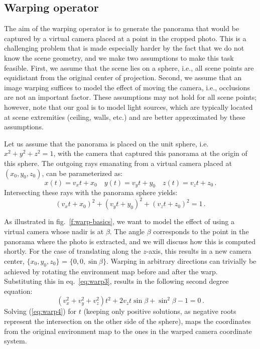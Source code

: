 \subsection{Warping operator}

The aim of the warping operator is to generate the panorama that would be captured by a virtual camera placed at a point in the cropped photo. This is a challenging problem that is made especially harder by the fact that we do not know the scene geometry, and we make two assumptions to make this task feasible. First, we assume that the scene lies on a sphere, i.e., all scene points are equidistant from the original center of projection. Second, we assume that an image warping suffices to model the effect of moving the camera, i.e., occlusions are not an important factor. These assumptions may not hold for all scene points; however, note that our goal is to model light sources, which are typically located at scene extremities (ceiling, walls, etc.) and are better approximated by these assumptions.

Let us assume that the panorama is placed on the unit sphere, i.e. $x^2 + y^2 + z^2 = 1$, with the camera that captured this panorama at the origin of this sphere. The outgoing rays emanating from a virtual camera placed at $(x_0,y_0,z_0)$, can be parameterized as:
%
\begin{equation}
x(t) = v_x t + x_0  \quad
y(t) = v_y t + y_0  \quad
z(t) = v_z t + z_0  \,.
\label{eq:warp2}
\end{equation}
%
Intersecting these rays with the panorama sphere yields:
%
\begin{equation}
    (v_x t + x_0)^2 + (v_y t + y_0)^2 + (v_z t + z_0)^2 = 1 \,.
    \label{eq:warp3}
\end{equation}
% 

As illustrated in fig.~\ref{f:warp-basics}, we want to model the effect of using a virtual camera whose nadir is at $\beta$. The angle $\beta$ corresponds to the point in the panorama where the photo is extracted, and we will discuss how this is computed shortly. For the case of translating along the $z$-axis, this results in a new camera center, $\{x_0, y_0, z_0\}$ = $\{0, 0, \sin \beta\}$. Warping in arbitrary directions can trivially be achieved by rotating the environment map before and after the warp. Substituting this in eq.~\ref{eq:warp3}, results in the following second degree equation:
%
\begin{equation}
(v_x^2 + v_y^2 + v_z^2)t^2 + 2v_z t \sin\beta  + \sin^2\beta - 1 = 0 \,.
\label{eq:warp4}
\end{equation}
%
Solving (\ref{eq:warp4}) for $t$ (keeping only positive solutions, as negative roots represent the intersection on the other side of the sphere), maps the coordinates from the original environment map to the ones in the warped camera coordinate system. 

